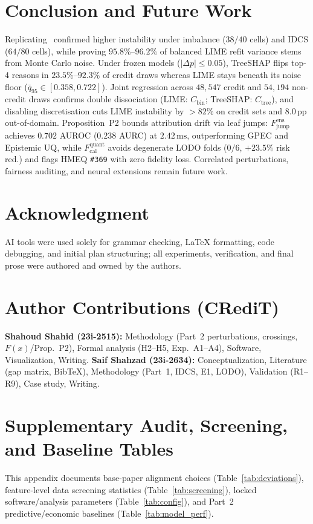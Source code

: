 \documentclass[conference]{IEEEtran}
\begin{document}
\section{Conclusion and Future Work}
\label{sec:conclusion}
Replicating~\cite{ballegeer2025} confirmed higher instability under imbalance ($38/40$ cells) and IDCS ($64/80$ cells), while proving $95.8\%$--$96.2\%$ of balanced LIME refit variance stems from Monte Carlo noise. Under frozen models ($|\Delta p|\le 0.05$), TreeSHAP flips top-4 reasons in $23.5\%$--$92.3\%$ of credit draws whereas LIME stays beneath its noise floor ($\bar{q}_{95}\in[0.358,0.722]$). Joint regression across $48{,}547$ credit and $54{,}194$ non-credit draws confirms double dissociation (LIME: $C_{\mathrm{bin}}$; TreeSHAP: $C_{\mathrm{tree}}$), and disabling discretisation cuts LIME instability by $>82\%$ on credit sets and $8.0\,\text{pp}$ out-of-domain. Proposition~P2 bounds attribution drift via leaf jumps: $F_{\mathrm{jump}}^{\mathrm{ens}}$ achieves $0.702$ AUROC ($0.238$ AURC) at $2.42\,\text{ms}$, outperforming GPEC and Epistemic UQ, while $F_{\mathrm{cal}}^{\mathrm{quant}}$ avoids degenerate LODO folds ($0/6$, $+23.5\%$ risk red.) and flags HMEQ \texttt{\#369} with zero fidelity loss. Correlated perturbations, fairness auditing, and neural extensions remain future work.

\section*{Acknowledgment}
AI tools were used solely for grammar checking, LaTeX formatting, code debugging, and initial plan structuring; all experiments, verification, and final prose were authored and owned by the authors.

\section*{Author Contributions (CRediT)}
\textbf{Shahoud Shahid (23i-2515):} Methodology (Part~2 perturbations, crossings, $F(x)$/Prop.~P2), Formal analysis (H2--H5, Exp.~A1--A4), Software, Visualization, Writing. \textbf{Saif Shahzad (23i-2634):} Conceptualization, Literature (gap matrix, BibTeX), Methodology (Part~1, IDCS, E1, LODO), Validation (R1--R9), Case study, Writing.




\clearpage
\appendices
\section{Supplementary Audit, Screening, and Baseline Tables}
\label{app:tables}
This appendix documents base-paper alignment choices (Table~\ref{tab:deviations}), feature-level data screening statistics (Table~\ref{tab:screening}), locked software/analysis parameters (Table~\ref{tab:config}), and Part~2 predictive/economic baselines (Table~\ref{tab:model_perf}).
\end{document}
